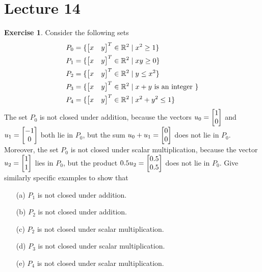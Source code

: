 \documentclass[a4paper]{amsart}
\theoremstyle{definition}
\newtheorem{exercise}{Exercise}
\begin{document}
\section{Lecture 14}

\begin{exercise}\label{ex-subspace-i}
 Consider the following sets
 \begin{align*}
  P_0 &= \{\left[\begin{matrix} x&y\end{matrix}\right]^T \in{\mathbb{R}}^2\;|\; x^2\geq 1\} \\
  P_1 &= \{\left[\begin{matrix} x&y\end{matrix}\right]^T\in{\mathbb{R}}^2\;|\; xy\geq 0\} \\
  P_2 &= \{\left[\begin{matrix} x&y\end{matrix}\right]^T\in{\mathbb{R}}^2\;|\; y\leq x^2\} \\
  P_3 &= \{\left[\begin{matrix} x&y\end{matrix}\right]^T\in{\mathbb{R}}^2\;|\; x+y \text{ is an integer }\} \\
  P_4 &= \{\left[\begin{matrix} x&y\end{matrix}\right]^T\in{\mathbb{R}}^2\;|\; x^2+y^2\leq 1\} \\
 \end{align*}
 The set $P_0$ is not closed under addition, because the vectors
 $u_0=\left[\begin{matrix} 1\\0\end{matrix}\right]$ and $u_1=\left[\begin{matrix} -1\\0\end{matrix}\right]$ both lie in $P_0$, but
 the sum $u_0+u_1=\left[\begin{matrix} 0\\0\end{matrix}\right]$ does not lie in $P_0$.  Moreover, the
 set $P_0$ is not closed under scalar multiplication, because the
 vector $u_2=\left[\begin{matrix} 1\\1\end{matrix}\right]$ lies in $P_0$, but the product
 $0.5 u_2=\left[\begin{matrix} 0.5\\0.5\end{matrix}\right]$ does not lie in $P_0$.  Give similarly
 specific examples to show that
 \begin{itemize}
  \item[(a)] $P_1$ is not closed under addition. 
  \item[(b)] $P_2$ is not closed under addition. 
  \item[(c)] $P_2$ is not closed under scalar multiplication. 
  \item[(d)] $P_3$ is not closed under scalar multiplication. 
  \item[(e)] $P_4$ is not closed under scalar multiplication. 
 \end{itemize}
\end{exercise}
\end{document}

